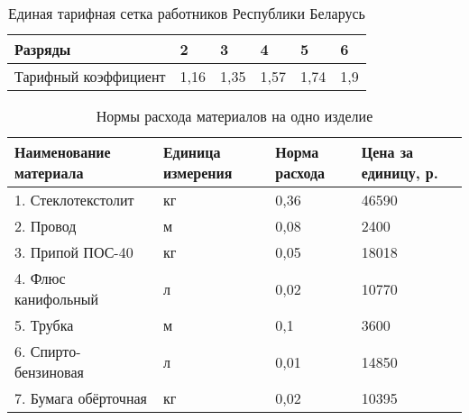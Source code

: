 \begin{table}[h!]
  \caption{Единая тарифная сетка работников Республики Беларусь}
  \label{tbl:tariffs_grid}
  \centering
  \small{
    \begin{tabular}{| p{} | p{} |
                      p{} | p{} |
                      p{} | p{} |}
      \hline
      Разряды & 2 & 3 & 4 & 5 & 6 \\ \hline

      Тарифный коэффициент & 1,16 & 1,35 & 1,57 & 1,74 & 1,9 \\ \hline

    \end{tabular}
  }
\end{table}

\begin{table}[h!]
  \caption{Нормы расхода материалов на одно изделие}
  \label{tbl:material_costs}
  \centering
  \small{
    \begin{tabular}{| p{} | p{} |
                      p{} | p{} |}
      \hline
      Наименование материала & Единица измерения &
      Норма расхода & Цена за единицу, р. \\ \hline

      1. Стеклотекстолит   & кг & 0,36  & 46590 \\ \hline
      2. Провод            & м  & 0,08  & 2400  \\ \hline
      3. Припой ПОС-40     & кг & 0,05  & 18018 \\ \hline
      4. Флюс канифольный  & л  & 0,02  & 10770 \\ \hline
      5. Трубка            & м  & 0,1   & 3600  \\ \hline
      6. Спирто-бензиновая & л  & 0,01  & 14850 \\ \hline
      7. Бумага обёрточная & кг & 0,02  & 10395 \\ \hline

    \end{tabular}
  }
\end{table}

